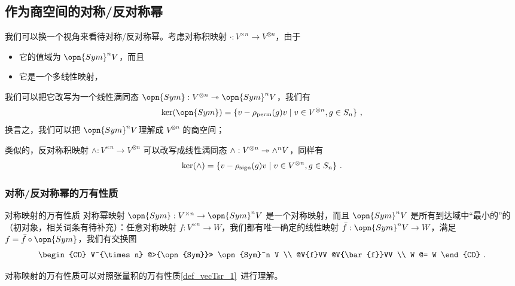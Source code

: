 \subsection{作为商空间的对称/反对称幂}

我们可以换一个视角来看待对称/反对称幂。考虑对称积映射 $\cdot: V^{\times n} \to V^{\otimes n}$，由于
\begin{itemize}
\item 它的值域为 $\opn{Sym}^n V$，而且
\item 它是一个多线性映射，
\end{itemize}
我们可以把它改写为一个线性满同态 $\opn{Sym}: V^{\otimes n} \twoheadrightarrow \opn{Sym}^n V$，我们有
\begin{equation}
\ker(\opn{Sym}) = \{v - \rho_\text{perm}(g) v \mid v \in V^{\otimes n}, g \in S_n\}~,
\end{equation}
换言之，我们可以把 $\opn{Sym}^n V$理解成 $V^{\otimes n}$ 的商空间；

类似的，反对称积映射 $\wedge: V^{\times n} \to V^{\otimes n}$ 可以改写成线性满同态 ${\large \wedge}: V^{\otimes n} \twoheadrightarrow {\large \wedge}^n V$，同样有
\begin{equation}
\ker({\large \wedge}) = \{v - \rho_\text{sign}(g) v \mid v \in V^{\otimes n}, g \in S_n\}~.
\end{equation}

\subsubsection{对称/反对称幂的万有性质}


\begin{theorem}{对称映射的万有性质}
对称幂映射 $\opn{Sym}: V^{\times n} \to \opn{Sym}^n V$ 是一个对称映射，而且 $\opn{Sym}^n V$ 是所有到达域中“最小的”的（初对象，相关词条有待补充）：任意对称映射 $f: V^{\times n} \to W$，我们都有唯一确定的线性映射 $\bar{f}: \opn{Sym}^n V \to W$，满足 $f = \bar{f} \circ \opn{Sym}$，我们有交换图
\begin{equation}
\begin{CD}
V^{\times n} @>{\opn{Sym}}>> \opn{Sym}^n V \\
@V{f}VV @V{\bar{f}}VV \\
W @= W
\end{CD}~.
\end{equation}
\end{theorem}

对称映射的万有性质可以对照张量积的万有性质\autoref{def_vecTsr_1}~进行理解。

